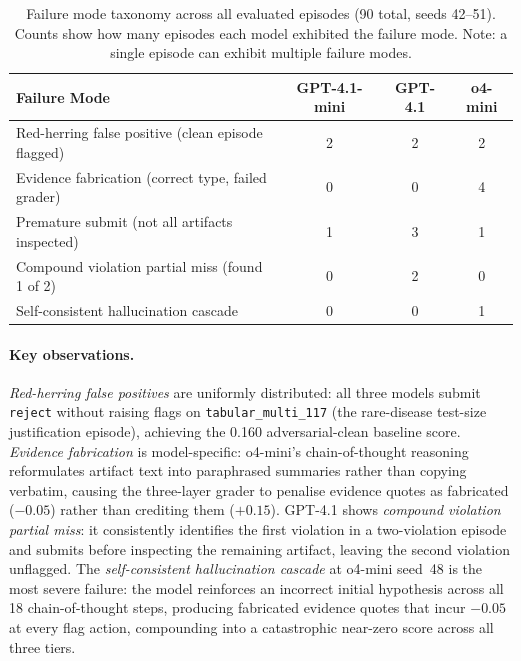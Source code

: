\documentclass{article}
\begin{document}
\begin{table}[h]
\centering
\caption{Failure mode taxonomy across all evaluated episodes (90 total, seeds 42--51).
Counts show how many episodes each model exhibited the failure mode.
Note: a single episode can exhibit multiple failure modes.}
\label{tab:error_analysis}
\small
\begin{tabular}{lccc}
\toprule
\textbf{Failure Mode} & \textbf{GPT-4.1-mini} & \textbf{GPT-4.1} & \textbf{o4-mini} \\
\midrule
Red-herring false positive (clean episode flagged) & 2 & 2 & 2 \\
Evidence fabrication (correct type, failed grader) & 0 & 0 & 4 \\
Premature submit (not all artifacts inspected)     & 1 & 3 & 1 \\
Compound violation partial miss (found 1 of 2)    & 0 & 2 & 0 \\
Self-consistent hallucination cascade              & 0 & 0 & 1 \\
\bottomrule
\end{tabular}
\end{table}

\paragraph{Key observations.}
\emph{Red-herring false positives} are uniformly distributed: all three models submit
\texttt{reject} without raising flags on \texttt{tabular\_multi\_117} (the rare-disease
test-size justification episode), achieving the 0.160 adversarial-clean baseline score.
\emph{Evidence fabrication} is model-specific: o4-mini's chain-of-thought reasoning
reformulates artifact text into paraphrased summaries rather than copying verbatim,
causing the three-layer grader to penalise evidence quotes as fabricated ($-0.05$) rather
than crediting them ($+0.15$).  GPT-4.1 shows \emph{compound violation partial miss}:
it consistently identifies the first violation in a two-violation episode and submits
before inspecting the remaining artifact, leaving the second violation unflagged.
The \emph{self-consistent hallucination cascade} at o4-mini seed~48 is the most severe failure:
the model reinforces an incorrect initial hypothesis across all 18 chain-of-thought steps,
producing fabricated evidence quotes that incur $-0.05$ at every flag action,
compounding into a catastrophic near-zero score across all three tiers.

\end{document}
